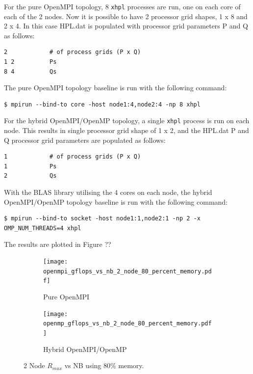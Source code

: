 \documentclass{report}
\begin{document}
For the pure OpenMPI topology, 8 \verb|xhpl| processes are run, one on each core of each of the 2 nodes. Now it is possible to have 2 processor grid shapes, 1 x 8 and 2 x 4. In this case HPL.dat is populated with processor grid parameters P and Q as follows:

\lstset{style=listing}
\begin{lstlisting}[numbers=none]
2            # of process grids (P x Q)
1 2          Ps
8 4          Qs
\end{lstlisting}

The pure OpenMPI topology baseline is run with the following command:

\lstset{style=type}
\begin{lstlisting}[]
$ mpirun --bind-to core -host node1:4,node2:4 -np 8 xhpl
\end{lstlisting}

For the hybrid OpenMPI/OpenMP topology, a single \verb|xhpl| process is run on each node. This results in single processor grid shape of 1 x 2, and the HPL.dat P and Q processor grid parameters are populated as follows:

\lstset{style=listing}
\begin{lstlisting}[numbers=none]
1            # of process grids (P x Q)
1            Ps
2            Qs
\end{lstlisting}

With the BLAS library utilising the 4 cores on each node, the hybrid OpenMPI/OpenMP topology baseline is run with the following command:

\lstset{style=type}
\begin{lstlisting}[]
$ mpirun --bind-to socket -host node1:1,node2:1 -np 2 -x OMP_NUM_THREADS=4 xhpl
\end{lstlisting}

The results are plotted in Figure ??

\begin{figure}[H]
	\begin{subfigure}{1.0\textwidth}
		\centering
		\texttt{[image: openmpi\_gflops\_vs\_nb\_2\_node\_80\_percent\_memory.pdf]}
		\caption{Pure OpenMPI}
		\label{fig:subim1}
	\end{subfigure}
	\par\bigskip
	\begin{subfigure}{1.0\textwidth}
		\centering
		\texttt{[image: openmp\_gflops\_vs\_nb\_2\_node\_80\_percent\_memory.pdf]}
		\caption{Hybrid OpenMPI/OpenMP}
		\label{fig:subim2}
	\end{subfigure}
\caption{2 Node $R_{max}$ vs NB using 80\% memory.}
\label{fig:image2}
\end{figure}
\end{document}
